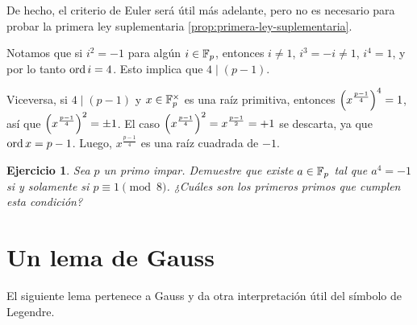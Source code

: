 \documentclass{article}
\theoremstyle{plain}
\newtheorem{ejerc}{Ejercicio}
\begin{document}
\begin{comentario}
  De hecho, el criterio de Euler será útil más adelante, pero no es necesario
  para probar la primera ley suplementaria \ref{prop:primera-ley-suplementaria}.

  Notamos que si $i^2 = -1$ para algún $i \in \mathbb{F}_p$, entonces $i \ne 1$,
  $i^3 = -i \ne 1$, $i^4 = 1$, y por lo tanto $\operatorname{ord} i = 4$. Esto implica que
  $4 \mid (p-1)$.

  Viceversa, si $4 \mid (p-1)$ y $x \in \mathbb{F}_p^\times$ es una raíz primitiva,
  entonces $\Bigl(x^{\frac{p-1}{4}}\Bigr)^4 = 1$, así que
  $\Bigl(x^{\frac{p-1}{4}}\Bigr)^2 = \pm 1$. El caso
  $\Bigl(x^{\frac{p-1}{4}}\Bigr)^2 = x^{\frac{p-1}{2}} = +1$ se descarta, ya que
  $\operatorname{ord} x = p-1$. Luego, $x^{\frac{p-1}{4}}$ es una raíz cuadrada de $-1$.
\end{comentario}

\begin{ejerc}
  Sea $p$ un primo impar. Demuestre que existe $a \in \mathbb{F}_p$ tal que $a^4 = -1$
  si y solamente si $p \equiv 1 \pmod{8}$. ¿Cuáles son los primeros primos que
  cumplen esta condición?
\end{ejerc}


\section{Un lema de Gauss}

El siguiente lema pertenece a Gauss y da otra interpretación útil del símbolo de
Legendre.
\end{document}
